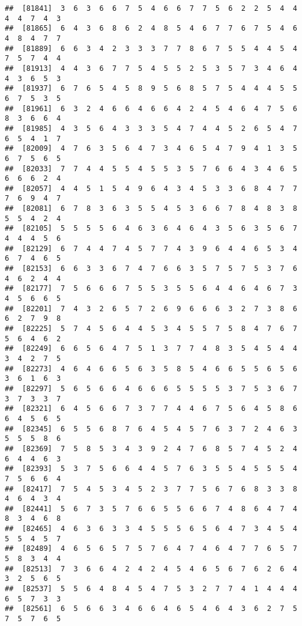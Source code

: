 \documentclass[
]{book}
\begin{document}
\begin{verbatim}
##  [81841]  3  6  3  6  6  7  5  4  6  6  7  7  5  6  2  2  5  4  4  4  4  7  4  3
##  [81865]  6  4  3  6  8  6  2  4  8  5  4  6  7  7  6  7  5  4  6  4  8  4  7  7
##  [81889]  6  6  3  4  2  3  3  3  7  7  8  6  7  5  5  4  4  5  4  7  5  7  4  4
##  [81913]  4  4  3  6  7  7  5  4  5  5  2  5  3  5  7  3  4  6  4  4  3  6  5  3
##  [81937]  6  7  6  5  4  5  8  9  5  6  8  5  7  5  4  4  4  5  5  6  7  5  3  5
##  [81961]  6  3  2  4  6  6  4  6  6  4  2  4  5  4  6  4  7  5  6  8  3  6  6  4
##  [81985]  4  3  5  6  4  3  3  3  5  4  7  4  4  5  2  6  5  4  7  6  5  4  1  7
##  [82009]  4  7  6  3  5  6  4  7  3  4  6  5  4  7  9  4  1  3  5  6  7  5  6  5
##  [82033]  7  7  4  4  5  5  4  5  5  3  5  7  6  6  4  3  4  6  5  6  6  6  2  4
##  [82057]  4  4  5  1  5  4  9  6  4  3  4  5  3  3  6  8  4  7  7  7  6  9  4  7
##  [82081]  6  7  8  3  6  3  5  5  4  5  3  6  6  7  8  4  8  3  8  5  5  4  2  4
##  [82105]  5  5  5  5  6  4  6  3  6  4  6  4  3  5  6  3  5  6  7  4  4  4  5  6
##  [82129]  6  7  4  4  7  4  5  7  7  4  3  9  6  4  4  6  5  3  4  6  7  4  6  5
##  [82153]  6  6  3  3  6  7  4  7  6  6  3  5  7  5  7  5  3  7  6  4  6  2  4  4
##  [82177]  7  5  6  6  6  7  5  5  3  5  5  6  4  4  6  4  6  7  3  4  5  6  6  5
##  [82201]  7  4  3  2  6  5  7  2  6  9  6  6  6  3  2  7  3  8  6  6  2  7  9  8
##  [82225]  5  7  4  5  6  4  4  5  3  4  5  5  7  5  8  4  7  6  7  5  6  4  6  2
##  [82249]  6  6  5  6  4  7  5  1  3  7  7  4  8  3  5  4  5  4  4  3  4  2  7  5
##  [82273]  4  6  4  6  6  5  6  3  5  8  5  4  6  6  5  5  6  5  6  3  6  1  6  3
##  [82297]  5  6  5  6  6  4  6  6  6  5  5  5  5  3  7  5  3  6  7  3  7  3  3  7
##  [82321]  6  4  5  6  6  7  3  7  7  4  4  6  7  5  6  4  5  8  6  6  4  5  6  5
##  [82345]  6  5  5  6  8  7  6  4  5  4  5  7  6  3  7  2  4  6  3  5  5  5  8  6
##  [82369]  7  5  8  5  3  4  3  9  2  4  7  6  8  5  7  4  5  2  4  6  4  4  6  3
##  [82393]  5  3  7  5  6  6  4  4  5  7  6  3  5  5  4  5  5  5  4  7  5  6  6  4
##  [82417]  7  5  4  5  3  4  5  2  3  7  7  5  6  7  6  8  3  3  8  4  6  4  3  4
##  [82441]  5  6  7  3  5  7  6  6  5  5  6  6  7  4  8  6  4  7  4  8  3  4  6  8
##  [82465]  4  6  3  6  3  3  4  5  5  5  6  5  6  4  7  3  4  5  4  5  5  4  5  7
##  [82489]  4  6  5  6  5  7  5  7  6  4  7  4  6  4  7  7  6  5  7  5  8  3  4  4
##  [82513]  7  3  6  6  4  2  4  2  4  5  4  6  5  6  7  6  2  6  4  3  2  5  6  5
##  [82537]  5  5  6  4  8  4  5  4  7  5  3  2  7  7  4  1  4  4  4  6  5  7  3  3
##  [82561]  6  5  6  6  3  4  6  6  4  6  5  4  6  4  3  6  2  7  5  7  5  7  6  5

\end{verbatim}
\end{document}
